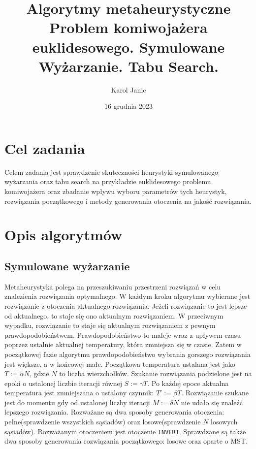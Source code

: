 \documentclass{article}
\begin{document}
\begin{titlingpage}
    \title{Algorytmy metaheurystyczne\\[1ex] \large Problem komiwojażera euklidesowego. Symulowane Wyżarzanie. Tabu Search.}
    \author{Karol Janic}
    \date{16 grudnia 2023}

    \maketitle
\end{titlingpage}

\tableofcontents

\newpage

\section{Cel zadania}
Celem zadania jest sprawdzenie skuteczności heurystyki symulowanego wyżarzania oraz tabu search na przykładzie euklidesowego problemu komiwojażera oraz
zbadanie wpływu wyboru parametrów tych heurystyk, rozwiązania początkowego i metody generowania otoczenia na jakość rozwiązania.

\section{Opis algorytmów}
\subsection{Symulowane wyżarzanie}
Metaheurystyka polega na przeszukiwaniu przestrzeni rozwiązań w celu znalezienia rozwiązania optymalnego. 
\newline
W każdym kroku algorytmu wybierane jest rozwiązanie z otoczenia aktualnego rozwiązania. Jeżeli rozwiązanie to jest lepsze od aktualnego, to staje się ono aktualnym rozwiązaniem. 
W przeciwnym wypadku, rozwiązanie to staje się aktualnym rozwiązaniem z pewnym prawdopodobieństwem. Prawdopodobieństwo to maleje wraz z upływem czasu poprzez ustalnie aktualnej temperatury, 
która zmniejsza się w czasie. Zatem w początkowej fazie algorytmu prawdopodobieństwo wybrania gorszego rozwiązania jest większe, a w końcowej małe.
\newline
Początkowa temperatura ustalana jest jako $T := \alpha N$, gdzie $N$ to liczba wierzchołków.
Szukanie rozwiązania podzielone jest na epoki o ustalonej liczbie iteracji równej $S := \gamma T$. Po każdej epoce aktualna temperatura jest zmniejszana o ustalony czynnik: $T' := \beta T$.
Rozwiązanie szukane jest do momentu gdy od ustalonej liczby iteracji $M := \delta N$ nie udało się znaleźć lepszego rozwiązania.
\newline
Rozważane są dwa sposoby generowania otoczenia: pełne(sprawdzenie wszystkich sąsiadów) oraz losowe(sprawdzenie $N$ losowych sąsiadów). Rozważanym otoczeniem jest otoczenie \texttt{INVERT}.
Sprawdzane są także dwa sposoby generowania rozwiązania początkowego: losowe oraz oparte o MST.
\end{document}
